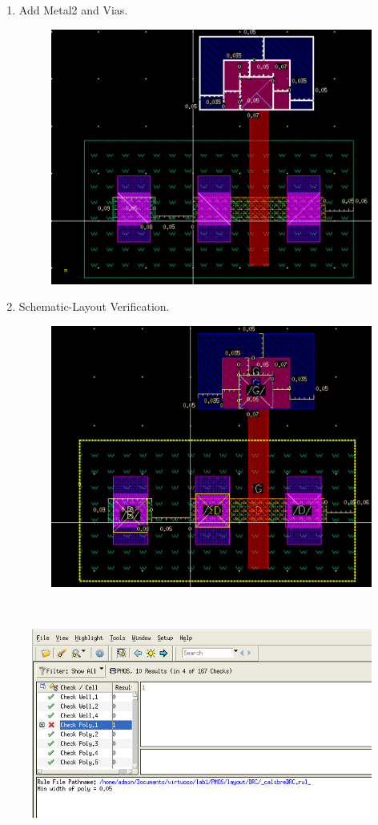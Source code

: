 \begin{enumerate}[leftmargin=*, label = Step \arabic*:]
	\item Add Metal2 and Vias.
	\begin{figure}[H]
		\centering
		\includegraphics[width=.7\linewidth]{sections/pic/EX4_PMOS_metal2_vias.png}
		\label{f_EX4_PMOS_metal2_vias}
	\end{figure}
	\item Schematic-Layout Verification.
	\begin{figure}[H]
		\centering
		\includegraphics[width=.7\linewidth]{sections/pic/EX4_PMOS_layout_schematic.png}
		\label{f_EX4_PMOS_layout_schematic}
	\end{figure}
\end{enumerate}

\\

\begin{figure}[H]
	\centering
	\includegraphics[width=.7\linewidth]{sections/pic/EX4_PMOS_DRC.png}
	\label{f_EX4_PMOS_DRC}
\end{figure}

